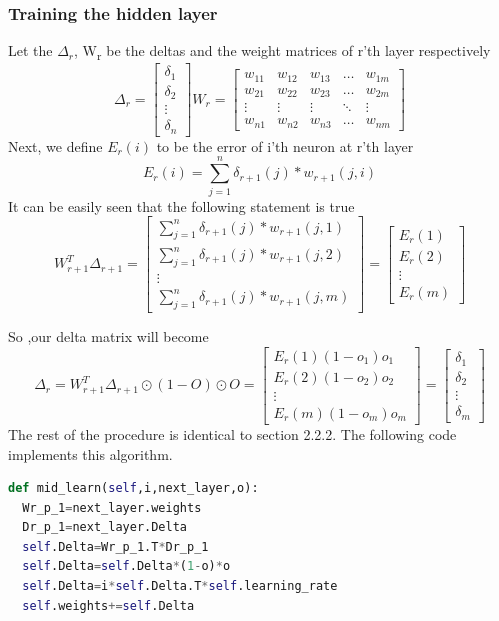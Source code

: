 \documentclass{proc}
\begin{document}
	\subsubsection{Training the hidden layer}
	Let the $\Delta_r$, W\textsubscript{r} be the deltas and the weight matrices  of r'th layer respectively
	\[
	\Delta_r=
	\begin{bmatrix}
	\delta_1\\
	\delta_2\\
	\vdots\\
	\delta_n
	\end{bmatrix} 	 
	W_r=
	\begin{bmatrix}
	w_{11} & w_{12} & w_{13} & \dots  & w_{1m} \\
	w_{21} & w_{22} & w_{23} & \dots  & w_{2m} \\
	\vdots & \vdots & \vdots & \ddots & \vdots \\
	w_{n1} & w_{n2} & w_{n3} & \dots  & w_{nm}
	\end{bmatrix} 
	\]
	Next, we define ${E_r(i)}$ to be the error of i'th neuron at r'th layer
	\[ E_r(i)=\sum_{j=1}^{n} \delta_{r+1}(j)*w_{r+1}(j,i)  \]
	It can be easily seen that the following statement is true
	\[
	W_{r+1}^T\Delta_{r+1}=
	\begin{bmatrix}
	\sum_{j=1}^{n} \delta_{r+1}(j)*w_{r+1}(j,1)\\
	\sum_{j=1}^{n} \delta_{r+1}(j)*w_{r+1}(j,2)\\
	\vdots\\
	\sum_{j=1}^{n} \delta_{r+1}(j)*w_{r+1}(j,m)
	\end{bmatrix} 
	=
	\begin{bmatrix}
	 E_r(1)\\
	 E_r(2)\\
	\vdots\\
	 E_r(m)
	\end{bmatrix} 
	\]
	
	So ,our delta matrix will become
	\[
	\Delta_r=
	W_{r+1}^T\Delta_{r+1}\odot(1-O)\odot O=
	\begin{bmatrix}
	E_r(1)(1-o_{1})o_{1}\\
	E_r(2)(1-o_{2})o_{2}\\
	\vdots\\
	E_r(m)(1-o_{m})o_{m}
	\end{bmatrix} 
	=
	\begin{bmatrix}
	\delta_1\\
	\delta_2\\
	\vdots\\
	\delta_m
	\end{bmatrix} 
	\]
	The rest of the procedure is identical to section 2.2.2. The following code implements this algorithm.
	\begin{lstlisting}[language=Python]
def mid_learn(self,i,next_layer,o):
  Wr_p_1=next_layer.weights
  Dr_p_1=next_layer.Delta
  self.Delta=Wr_p_1.T*Dr_p_1
  self.Delta=self.Delta*(1-o)*o
  self.Delta=i*self.Delta.T*self.learning_rate
  self.weights+=self.Delta
	\end{lstlisting}
\end{document}
